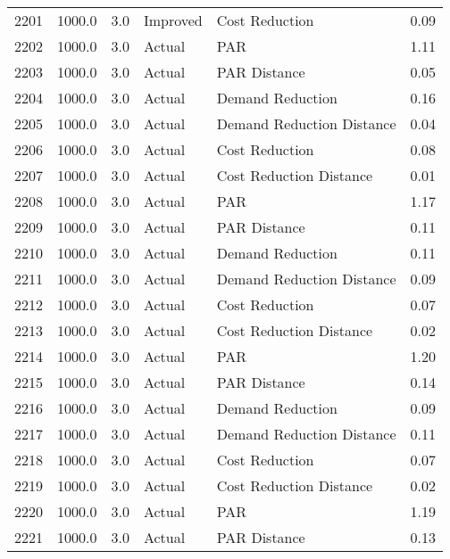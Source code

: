 \begin{longtable}{lrrllr}
2201 &       1000.0 &     3.0 &       Improved &             Cost Reduction &   0.09 \\
2202 &       1000.0 &     3.0 &         Actual &                        PAR &   1.11 \\
2203 &       1000.0 &     3.0 &         Actual &               PAR Distance &   0.05 \\
2204 &       1000.0 &     3.0 &         Actual &           Demand Reduction &   0.16 \\
2205 &       1000.0 &     3.0 &         Actual &  Demand Reduction Distance &   0.04 \\
2206 &       1000.0 &     3.0 &         Actual &             Cost Reduction &   0.08 \\
2207 &       1000.0 &     3.0 &         Actual &    Cost Reduction Distance &   0.01 \\
2208 &       1000.0 &     3.0 &         Actual &                        PAR &   1.17 \\
2209 &       1000.0 &     3.0 &         Actual &               PAR Distance &   0.11 \\
2210 &       1000.0 &     3.0 &         Actual &           Demand Reduction &   0.11 \\
2211 &       1000.0 &     3.0 &         Actual &  Demand Reduction Distance &   0.09 \\
2212 &       1000.0 &     3.0 &         Actual &             Cost Reduction &   0.07 \\
2213 &       1000.0 &     3.0 &         Actual &    Cost Reduction Distance &   0.02 \\
2214 &       1000.0 &     3.0 &         Actual &                        PAR &   1.20 \\
2215 &       1000.0 &     3.0 &         Actual &               PAR Distance &   0.14 \\
2216 &       1000.0 &     3.0 &         Actual &           Demand Reduction &   0.09 \\
2217 &       1000.0 &     3.0 &         Actual &  Demand Reduction Distance &   0.11 \\
2218 &       1000.0 &     3.0 &         Actual &             Cost Reduction &   0.07 \\
2219 &       1000.0 &     3.0 &         Actual &    Cost Reduction Distance &   0.02 \\
2220 &       1000.0 &     3.0 &         Actual &                        PAR &   1.19 \\
2221 &       1000.0 &     3.0 &         Actual &               PAR Distance &   0.13 \\

\end{longtable}
